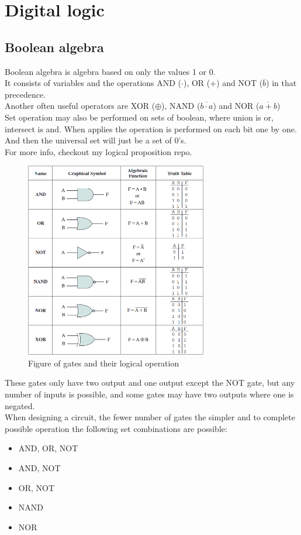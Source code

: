 \documentclass[12pt, a4paper]{article}
\begin{document}
	\section{Digital logic}
		\subsection{Boolean algebra}
			Boolean algebra is algebra based on only the values 1 or 0.\\
			It consists of variables and the operations AND ($\cdot$), OR (+) and NOT ($\overline{b}$) in that precedence.\\
			Another often useful operators are XOR ($\oplus$), NAND ($\overline{b\cdot a}$) and NOR ($\overline{a+b}$)\\
			Set operation may also be performed on sets of boolean, where union is or, intersect is and. When applies the operation is performed on each bit one by one.\\
			And then the universal set will just be a set of 0's.\\
			For more info, checkout my logical proposition repo.\\
			\begin{figure}[h!]
				\includegraphics[width=300px]{assets/gates.png}
				\centering
				\caption{Figure of gates and their logical operation}
			\end{figure}
			These gates only have two output and one output except the NOT gate, but any number of inputs is possible, and some gates may have two outputs where one is negated.\\
			When designing a circuit, the fewer number of gates the simpler and to complete possible operation the following set combinations are possible:
			\begin{itemize}
				\item AND, OR, NOT
				\item AND, NOT
				\item OR, NOT
				\item NAND
				\item NOR
			\end{itemize}
\end{document}
